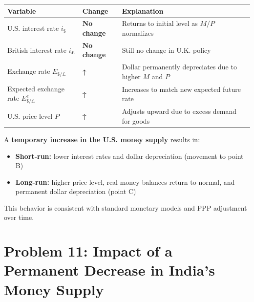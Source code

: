 \documentclass[
]{article}
\providecommand{\tightlist}{%
  \setlength{\itemsep}{0pt}\setlength{\parskip}{0pt}}
\begin{document}
\begin{longtable}[]{@{}
  >{\raggedright\arraybackslash}p{}
  >{\raggedright\arraybackslash}p{}
  >{\raggedright\arraybackslash}p{}@{}}
\toprule\noalign{}
\begin{minipage}[b]{\linewidth}\raggedright
Variable
\end{minipage} & \begin{minipage}[b]{\linewidth}\raggedright
Change
\end{minipage} & \begin{minipage}[b]{\linewidth}\raggedright
Explanation
\end{minipage} \\
\midrule\noalign{}
\endhead
\bottomrule\noalign{}
\endlastfoot
U.S. interest rate \(i_{\$}\) & \textbf{No change} & Returns to initial
level as \(M/P\) normalizes \\
British interest rate \(i_{£}\) & \textbf{No change} & Still no change
in U.K. policy \\
Exchange rate \(E_{\$/£}\) & \textbf{↑} & Dollar permanently depreciates
due to higher \(M\) and \(P\) \\
Expected exchange rate \(E^e_{\$/£}\) & \textbf{↑} & Increases to match
new expected future rate \\
U.S. price level \(P\) & \textbf{↑} & Adjusts upward due to excess
demand for goods \\
\end{longtable}

A \textbf{temporary increase in the U.S. money supply} results in:

\begin{itemize}
\tightlist
\item
  \textbf{Short-run:} lower interest rates and dollar depreciation
  (movement to point B)
\item
  \textbf{Long-run:} higher price level, real money balances return to
  normal, and permanent dollar depreciation (point C)
\end{itemize}

This behavior is consistent with standard monetary models and PPP
adjustment over time.

\section{Problem 11: Impact of a Permanent Decrease in India's Money
Supply}\label{problem-11-impact-of-a-permanent-decrease-in-indias-money-supply}
\end{document}
